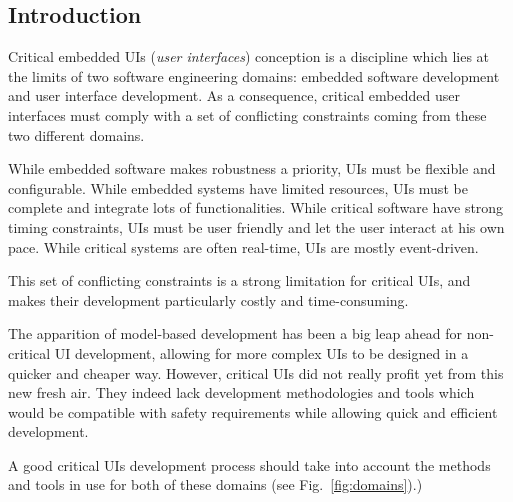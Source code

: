 \documentclass{jdt-tis}
\begin{document}
\begin{content}


  \section{Introduction}
  Critical embedded UIs (\emph{user interfaces}) conception is a discipline which lies at the limits of two software engineering domains: embedded software development and user interface development. As a consequence, critical embedded user interfaces must comply with a set of conflicting constraints coming from these two different domains. 

  While embedded software makes robustness a priority, UIs must be flexible and configurable. While embedded systems have limited resources, UIs must be complete and integrate lots of functionalities. While critical software have strong timing constraints, UIs must be user friendly and let the user interact at his own pace. While critical systems are often real-time, UIs are mostly event-driven.

  This set of conflicting constraints is a strong limitation for critical UIs, and makes their development particularly costly and time-consuming. 

  The apparition of model-based development has been a big leap ahead for non-critical UI development, allowing for more complex UIs to be designed in a quicker and cheaper way. However, critical UIs did not really profit yet from this new fresh air. They indeed lack development methodologies and tools which would be compatible with safety requirements while allowing quick and efficient development.

  A good critical UIs development process should take into account the methods and tools in use for both of these domains (see Fig.~\ref{fig:domains}).)

\newcommand{\Ca}{(0,0) ++(135:2)}
\newcommand{\Cb}{(0,0) ++(45:2)}

\begin{figure}[H]
\centering
\resizebox{\linewidth}{!}{

\begin{tikzpicture}

\begin{scope}
\clip \Cb circle (2);
\fill[lightgray] \Ca circle (2);
\end{scope}


\end{tikzpicture}}
\end{figure}
\end{content}
\end{document}
